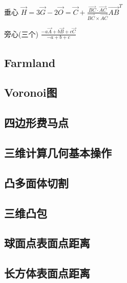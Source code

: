 \documentclass[10pt]{article}
\begin{document}
		垂心 $\overrightarrow{H} = 3\overrightarrow{G} - 2\overrightarrow{O} = \overrightarrow{C} + \frac{\overrightarrow{BC} \cdot \overrightarrow{AC}}{\overrightarrow{BC} \times \overrightarrow{AC}} \overrightarrow{AB} ^ {T}$

		旁心(三个) $\frac{-a\overrightarrow{A} + b\overrightarrow{B} + c\overrightarrow{C}}{-a + b + c}$

	\subsection{Farmland}
		

	\subsection{Voronoi图}
		

	\subsection{四边形费马点}
		

	\subsection{三维计算几何基本操作}
		

	\subsection{凸多面体切割}
		

	\subsection{三维凸包}
		

	\subsection{球面点表面点距离}
		
		
	\subsection{长方体表面点距离}
		
\end{document}
